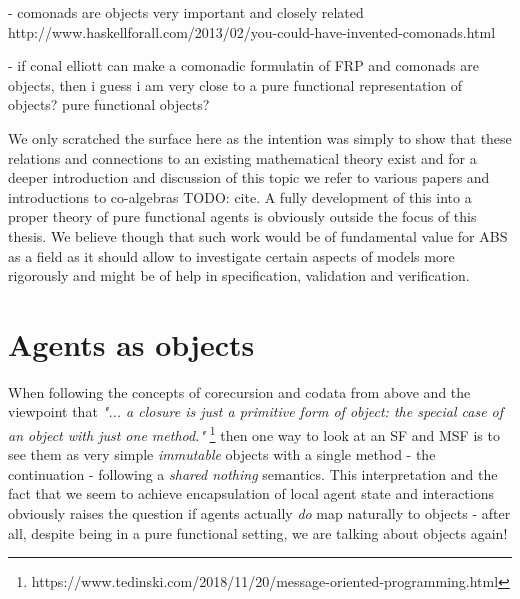 - comonads are objects very important and closely related http://www.haskellforall.com/2013/02/you-could-have-invented-comonads.html

- if conal elliott can make a comonadic formulatin of FRP and comonads are objects, then i guess i am very close to a pure functional representation of objects? pure functional objects?


We only scratched the surface here as the intention was simply to show that these relations and connections to an existing mathematical theory exist and for a deeper introduction and discussion of this topic we refer to various papers and introductions to co-algebras TODO: cite. A fully development of this into a proper theory of pure functional agents is obviously outside the focus of this thesis. We believe though that such work would be of fundamental value for ABS as a field as it should allow to investigate certain aspects of models more rigorously and might be of help in specification, validation and verification.

\section{Agents as objects}
When following the concepts of corecursion and codata from above and the viewpoint that \textit{"... a closure is just a primitive form of object: the special case of an object with just one method."} \footnote{https://www.tedinski.com/2018/11/20/message-oriented-programming.html} then one way to look at an SF and MSF is to see them as very simple \textit{immutable} objects with a single method - the continuation - following a \textit{shared nothing} semantics.  This interpretation and the fact that we seem to achieve encapsulation of local agent state and interactions obviously raises the question if agents actually \textit{do} map naturally to objects - after all, despite being in a pure functional setting, we are talking about objects again!

